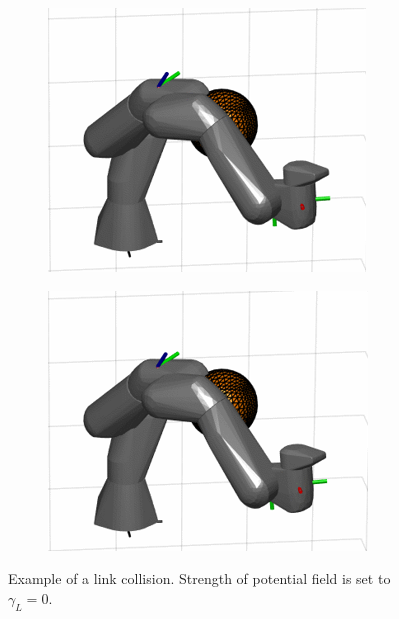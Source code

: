 \documentclass[../main.tex]{subfiles}
\begin{document}
\begin{figure}[H]
    \hfill
    \begin{subfigure}[b]{0.24\textwidth}
        \centering
         \includegraphics[width=\textwidth]{figures/linkcollision/g0_3.png}
        \label{}
    \end{subfigure}
    \hfill
    \begin{subfigure}[b]{0.24\textwidth}
        \centering
         \includegraphics[width=\textwidth]{figures/linkcollision/g0_4.png}
        \label{}
    \end{subfigure}
    \caption{Example of a link collision. Strength of potential field is set to $\gamma_L = 0$.}
    \label{fig:link:example:collision}
\end{figure}
\end{document}
